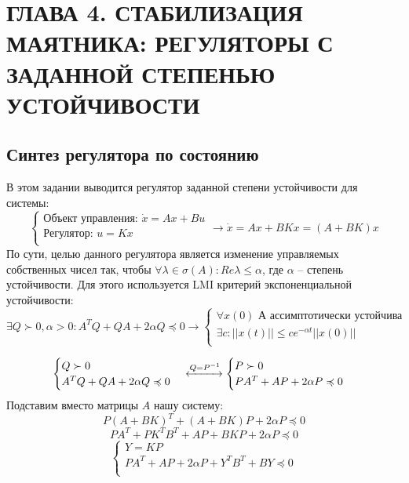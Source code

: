 \section{ГЛАВА 4. СТАБИЛИЗАЦИЯ МАЯТНИКА: РЕГУЛЯТОРЫ С ЗАДАННОЙ СТЕПЕНЬЮ УСТОЙЧИВОСТИ}

\subsection{Синтез регулятора по состоянию}
В этом задании выводится регулятор заданной степени устойчивости для системы:
\[
        \begin{cases}
                \text{Объект управления: }\dot{x} = A x + Bu \\
                \text{Регулятор: }u = K x \\
        \end{cases} \rightarrow
        \dot{x} = A x + BKx = (A+BK)x
\]
По сути, целью данного регулятора является изменение управляемых собственных чисел так, чтобы \(\forall \lambda \in \sigma(A): Re{\lambda} \leq \alpha\), где \(\alpha\) -- степень устойчивости.
Для этого используется LMI критерий экспоненциальной устойчивости:
\[ \exists Q \succ 0 , \alpha > 0 :  A^TQ + QA + 2 \alpha Q \preccurlyeq 0 \rightarrow
\begin{cases}
    \text{\(\forall x(0)\) А ассимптотически устойчива}\\
    \exists c :  ||x(t)|| \le  c e^{-\alpha t} ||x(0)|| \\
\end{cases}
\]

\[      \begin{cases}
                Q \succ 0\\
                A^TQ + QA + 2 \alpha Q \preccurlyeq 0 \\
        \end{cases} \xleftrightarrow{Q = P^{-1}}
        \begin{cases}
                P \succ 0\\
                PA^T + AP + 2 \alpha P \preccurlyeq 0\\
        \end{cases} 
\]
Подставим вместо матрицы \(A\) нашу систему:
\[P(A+BK)^T + (A+BK)P + 2 \alpha P \preccurlyeq 0\]
\[P A^T + P K^T B^T + AP + BKP + 2 \alpha P \preccurlyeq 0\]
\[
        \begin{cases}
                Y = KP\\
                PA^T + AP + 2 \alpha P + Y^T B^T + BY \preccurlyeq 0  \\
        \end{cases} 
\]


